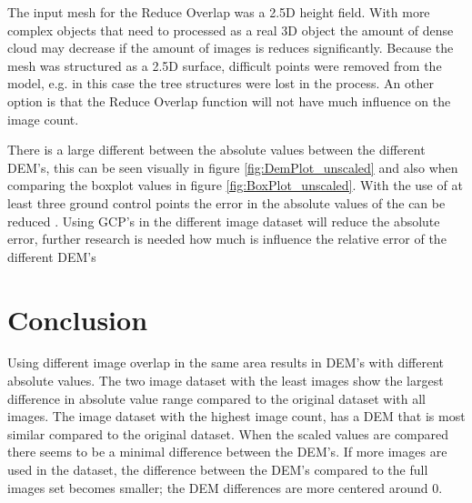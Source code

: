 \documentclass{isprs} %
\begin{document}
The input mesh for the Reduce Overlap was a 2.5D height field. 
With more complex objects that need to processed as a real 3D object the amount of dense cloud may decrease if the amount of images is reduces significantly.
Because the mesh was structured as a 2.5D surface, difficult points were removed from the model, e.g. in this case the tree structures were lost in the process.
An other option is that the Reduce Overlap function will not have much influence on the image count.

There is a large different between the absolute values between the different DEM's, this can be seen visually in figure \ref{fig:DemPlot_unscaled} and also when comparing the boxplot values in figure \ref{fig:BoxPlot_unscaled}.
With the use of at least three ground control points the error in the absolute values of the can be reduced \citep{AssessingUAVGCPS, GCPbetterAccuracy}.
Using GCP's in the different image dataset will reduce the absolute error, further research is needed how much is influence the relative error of the different DEM's

\section{Conclusion}
Using different image overlap in the same area results in DEM's with different absolute values.
The two image dataset with the least images show the largest difference in absolute value range compared to the original dataset with all images. 
The image dataset with the highest image count, has a DEM that is most similar compared to the original dataset.
When the scaled values are compared there seems to be a minimal difference between the DEM's.
If more images are used in the dataset, the difference between the DEM's compared to the full images set becomes smaller; the DEM differences are more centered around 0.


\sloppy




{
	\begin{spacing}{1.17}
		\normalsize
	\end{spacing}
}



\vspace{1cm}
\end{document}
